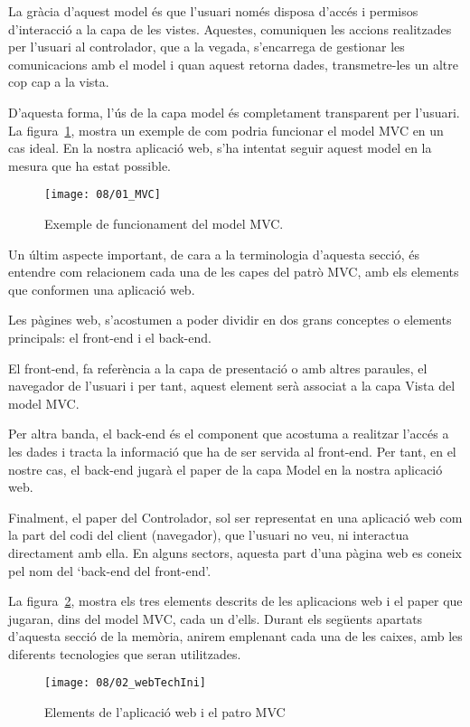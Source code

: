    La gràcia d'aquest model és que l'usuari només disposa d'accés i permisos d'in\-te\-rac\-ció a la capa de les vistes. Aquestes, comuniquen les accions realitzades per l'usuari al controlador, que a la vegada, s'encarrega de gestionar les comunicacions amb el model i quan aquest retorna dades, transmetre-les un altre cop cap a la vista.

    D'aquesta forma, l'ús de la capa model és completament transparent per l'usuari. La figura~\ref{fig:MVC}, mostra un exemple de com podria funcionar el model MVC en un cas ideal. En la nostra aplicació web, s'ha intentat seguir aquest model en la mesura que ha estat possible.

    \begin{figure}[h]
        \texttt{[image: 08/01\_MVC]}
        \centering
        \caption{Exemple de funcionament del model MVC.}\label{fig:MVC}
    \end{figure}

    Un últim aspecte important, de cara a la terminologia d'aquesta secció, és entendre com relacionem cada una de les capes del patrò MVC, amb els elements que conformen una aplicació web.

    Les pàgines web, s'acostumen a poder dividir en dos grans conceptes o elements principals: el front-end i el back-end.

    El front-end, fa referència a la capa de presentació o amb altres paraules, el navegador de l'usuari i per tant, aquest element serà associat a la capa Vista del model MVC.

    Per altra banda, el back-end és el component que acostuma a realitzar l'accés a les dades i tracta la informació que ha de ser servida al front-end. Per tant, en el nostre cas, el back-end jugarà el paper de la capa Model en la nostra aplicació web.

    Finalment, el paper del Controlador, sol ser representat en una aplicació web com la part del codi del client (navegador), que l'usuari no veu, ni interactua directament amb ella. En alguns sectors, aquesta part d'una pàgina web es coneix pel nom del `back-end del front-end'.

    La figura~\ref{fig:webElementsEmpty}, mostra els tres elements descrits de les aplicacions web i el paper que jugaran, dins del model MVC, cada un d'ells. Durant els següents apartats d'aquesta secció de la memòria, anirem emplenant cada una de les caixes, amb les diferents tecnologies que seran utilitzades.

    \begin{figure}[h]
        \texttt{[image: 08/02\_webTechIni]}
        \centering
        \caption{Elements de l'aplicació web i el patro MVC}\label{fig:webElementsEmpty}
    \end{figure}
